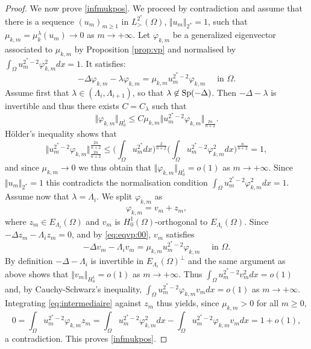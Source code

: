 \documentclass[10pt]{amsart}
\numberwithin{equation}{section}
\newcommand{\Sp}{{\rm Sp}}
\newcommand{\vp}{\varphi}
\newcommand{\Om}{\Omega}
\newcommand{\mkl}{\mu_{k}^{\lambda}}
\theoremstyle{plain}
\theoremstyle{remark}
\begin{document}
\begin{proof}
We now prove \eqref{infmukpos}. We proceed by contradiction and assume that there is a sequence $(u_m)_{m \ge1}$ in $L^{2^*}_{>}(\Om)$, $\Vert u_m \Vert_{2^*} = 1$, such that $\mu_{k,m} = \mkl(u_m) \to 0$ as $m \to + \infty$. Let $\vp_{k,m}$ be a generalized eigenvector associated to $\mu_{k,m}$ by Proposition \ref{prop:vp} and normalised by $\int_{\Om} u_m^{2^*-2} \vp_{k,m}^2dx = 1$. It satisfies:
\begin{equation} \label{eq:eqvp:00}
  - \Delta \vp_{k,m} - \lambda \vp_{k,m} = \mu_{k,m} u_m^{2^*-2} \vp_{k,m} \quad \text{ in } \Om. 
  \end{equation}
Assume first that $\lambda \in (\Lambda_i, \Lambda_{i+1})$, so that $\lambda \not \in \Sp(- \Delta)$. Then $- \Delta - \lambda$ is invertible and thus there exists $C = C_{\lambda}$ such that 
$$ \Vert \vp_{k,m} \Vert_{H^1_0} \le C \mu_{k,m} \Vert u_m^{2^*-2} \vp_{k,m} \Vert_{\frac{2n}{n+2}}.$$
H\"older's inequality shows that 
\begin{equation} \label{holder:spectre}
 \Vert u_m^{2^*-2} \vp_{k,m} \Vert_{\frac{2n}{n+2}}^{\frac{2n}{n+2}} \le \Big(\int_{\Om} u_m^{2^*}dx\Big)^{\frac{2}{n+2}} \Big( \int_{\Om} u_m^{2^*-2} \vp_{k,m}^2 dx\Big)^{\frac{n}{n+2}} = 1, 
 \end{equation}
and since $\mu_{k,m} \to 0$ we thus obtain that $ \Vert \vp_{k,m} \Vert_{H^1_0} = o(1)$ as $m \to + \infty$. Since $\Vert u_m \Vert_{2^*} = 1$ this contradicts the normalisation condition $\int_{\Om} u_m^{2^*-2} \vp_{k,m}^2dx = 1$. Assume now that $\lambda = \Lambda_i$. We split $\vp_{k,m}$ as 
$$ \vp_{k,m} = v_m + z_m, $$
where $z_m \in E_{\Lambda_i}(\Om)$ and $v_m$ is $H^1_0(\Om)$-orthogonal to $E_{\Lambda_i}(\Om)$. Since $-\Delta z_m - \Lambda_i z_m = 0$, and by \eqref{eq:eqvp:00}, $v_m$ satisfies 
\begin{equation} \label{eq:intermediaire}
 - \Delta v_m - \Lambda_i v_m = \mu_{k,m} u_m^{2^*-2} \vp_{k,m} \quad \text{ in } \Om. 
 \end{equation}
By definition $- \Delta-\Lambda_i$ is invertible in $E_{\Lambda_i}(\Om)^{\perp}$ and the same argument as above shows that $\Vert v_m \Vert_{H^1_0} = o(1)$ as $m \to + \infty$. Thus $\int_{\Om} u_m^{2^*-2} v_m^2 dx = o(1)$ and, by Cauchy-Schwarz's inequality, $\int_{\Om} u_m^{2^*-2} \vp_{k,m} v_m dx = o(1)$ as $m \to + \infty$. Integrating \eqref{eq:intermediaire} against $z_m$ thus yields, since $\mu_{k,m} >0$ for all $m \ge 0$,
$$ 0 = \int_{\Om} u_m^{2^*-2} \vp_{k,m} z_m = \int_{\Om} u_m^{2^*-2} \vp_{k,m}^2 dx-  \int_{\Om} u_m^{2^*-2} \vp_{k,m} v_m dx = 1 + o(1), $$
a contradiction. This proves \eqref{infmukpos}. 
 \end{proof}
\end{document}
